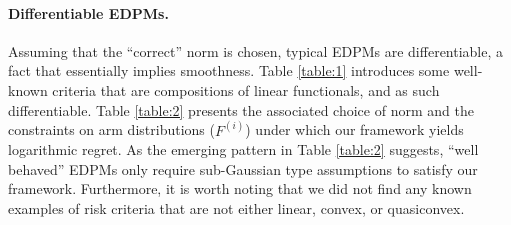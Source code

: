 \documentclass[final,12pt]{colt2018}
\newcommand{\prn}[1]{\left( #1 \right)}
\newcommand{\EDRMabbrv}{EDPM}
\newcommand{\Fi}[1][i]{F^{\prn{{#1}}}}
\begin{document}
	\paragraph{Differentiable \EDRMabbrv s.}
	Assuming that the ``correct'' norm is chosen, typical \EDRMabbrv s are differentiable, a fact that essentially implies smoothness. Table \ref{table:1} introduces some well-known criteria that are compositions of linear functionals, and as such differentiable. Table \ref{table:2} presents the associated choice of norm and the constraints on arm distributions ($\Fi$) under which our framework yields logarithmic regret. As the emerging pattern in Table \ref{table:2} suggests, ``well behaved'' \EDRMabbrv s only require sub-Gaussian type assumptions to satisfy our framework. Furthermore, it is worth noting that we did not find any known examples of risk criteria that are not either linear, convex, or quasiconvex.
\end{document}
